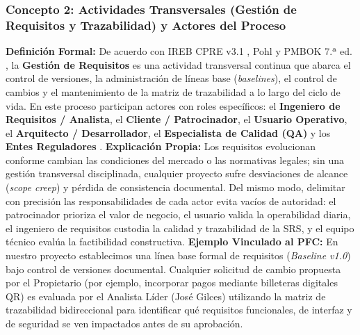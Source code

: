 \subsubsection{Concepto 2: Actividades Transversales (Gestión de Requisitos y Trazabilidad) y Actores del Proceso}
\textbf{Definición Formal:} De acuerdo con IREB CPRE v3.1 \cite{ireb2023}, Pohl \cite{pohl2025} y PMBOK 7.ª ed. \cite{pmbok}, la \textbf{Gestión de Requisitos} es una actividad transversal continua que abarca el control de versiones, la administración de líneas base (\textit{baselines}), el control de cambios y el mantenimiento de la matriz de trazabilidad a lo largo del ciclo de vida. En este proceso participan actores con roles específicos: el \textbf{Ingeniero de Requisitos / Analista}, el \textbf{Cliente / Patrocinador}, el \textbf{Usuario Operativo}, el \textbf{Arquitecto / Desarrollador}, el \textbf{Especialista de Calidad (QA)} y los \textbf{Entes Reguladores} \cite{ieee29148, wiegers2013}.
\textbf{Explicación Propia:} Los requisitos evolucionan conforme cambian las condiciones del mercado o las normativas legales; sin una gestión transversal disciplinada, cualquier proyecto sufre desviaciones de alcance (\textit{scope creep}) y pérdida de consistencia documental. Del mismo modo, delimitar con precisión las responsabilidades de cada actor evita vacíos de autoridad: el patrocinador prioriza el valor de negocio, el usuario valida la operabilidad diaria, el ingeniero de requisitos custodia la calidad y trazabilidad de la SRS, y el equipo técnico evalúa la factibilidad constructiva.
\textbf{Ejemplo Vinculado al PFC:} En nuestro proyecto establecimos una línea base formal de requisitos (\textit{Baseline v1.0}) bajo control de versiones documental. Cualquier solicitud de cambio propuesta por el Propietario (por ejemplo, incorporar pagos mediante billeteras digitales QR) es evaluada por el Analista Líder (José Gilces) utilizando la matriz de trazabilidad bidireccional para identificar qué requisitos funcionales, de interfaz y de seguridad se ven impactados antes de su aprobación.
